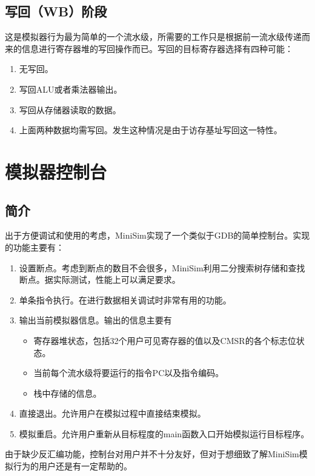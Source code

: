 \documentclass[12pt,a4paper,Flow]{report}
\begin{document}
\section{写回（WB）阶段}
这是模拟器行为最为简单的一个流水级，所需要的工作只是根据前一流水级传递而来的信息进行寄存器堆的写回操作而已。写回的目标寄存器选择有四种可能：
\begin{enumerate}
\item 无写回。
\item 写回ALU或者乘法器输出。
\item 写回从存储器读取的数据。
\item 上面两种数据均需写回。发生这种情况是由于访存基址写回这一特性。
\end{enumerate}
\chapter{模拟器控制台}
\section{简介}
出于方便调试和使用的考虑，MiniSim实现了一个类似于GDB的简单控制台。实现的功能主要有：
\begin{enumerate}
\item 设置断点。考虑到断点的数目不会很多，MiniSim利用二分搜索树存储和查找断点。据实际测试，性能上可以满足要求。
\item 单条指令执行。在进行数据相关调试时非常有用的功能。
\item 输出当前模拟器信息。输出的信息主要有
\begin{itemize}
\item 寄存器堆状态，包括32个用户可见寄存器的值以及CMSR的各个标志位状态。
\item 当前每个流水级将要运行的指令PC以及指令编码。
\item 栈中存储的信息。
\end{itemize}
\item 直接退出。允许用户在模拟过程中直接结束模拟。
\item 模拟重启。允许用户重新从目标程度的main函数入口开始模拟运行目标程序。
\end{enumerate}
由于缺少反汇编功能，控制台对用户并不十分友好，但对于想细致了解MiniSim模拟行为的用户还是有一定帮助的。
\end{document}
